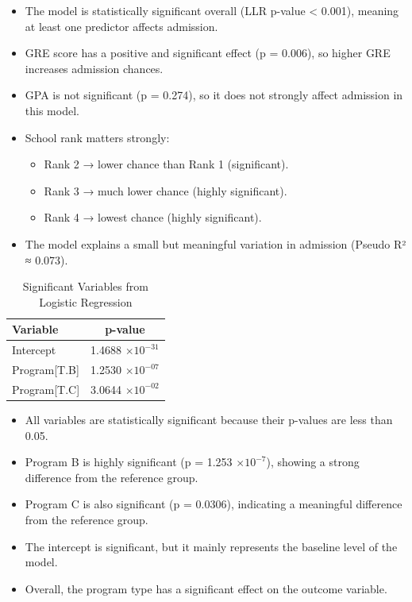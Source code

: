 \documentclass[12pt,a4paper]{report}
\begin{document}
\begin{tcolorbox}[colback=blue!5!white,colframe=blue!75!black,title=Interpretation of Logistic Regression Results]
\begin{itemize}
    \item The model is statistically significant overall (LLR p-value < 0.001), meaning at least one predictor affects admission.
    \item GRE score has a positive and significant effect (p = 0.006), so higher GRE increases admission chances.
    \item GPA is not significant (p = 0.274), so it does not strongly affect admission in this model.
    \item School rank matters strongly:
    \begin{itemize}
        \item Rank 2 → lower chance than Rank 1 (significant).
        \item Rank 3 → much lower chance (highly significant).
        \item Rank 4 → lowest chance (highly significant).
    \end{itemize}
    \item The model explains a small but meaningful variation in admission (Pseudo R² ≈ 0.073).
\end{itemize}
\end{tcolorbox}
\begin{table}[h!]
\centering
\begin{tabular}{|l|c|}
\hline
\textbf{Variable} & \textbf{p-value} \\ \hline
Intercept   & 1.4688 $\times 10^{-31}$ \\ \hline
Program[T.B] & 1.2530 $\times 10^{-07}$ \\ \hline
Program[T.C] & 3.0644 $\times 10^{-02}$ \\ \hline
\end{tabular}
\caption{Significant Variables from Logistic Regression}
\label{tab:significant_vars}
\end{table}
\begin{tcolorbox}[colback=green!5!white,colframe=green!60!black,title=Interpretation]
\begin{itemize}
    \item All variables are statistically significant because their p-values are less than 0.05.
    \item Program B is highly significant (p = 1.253 $\times 10^{-7}$), showing a strong difference from the reference group.
    \item Program C is also significant (p = 0.0306), indicating a meaningful difference from the reference group.
    \item The intercept is significant, but it mainly represents the baseline level of the model.
    \item Overall, the program type has a significant effect on the outcome variable.
\end{itemize}
\end{tcolorbox}
\clearpage
\end{document}
